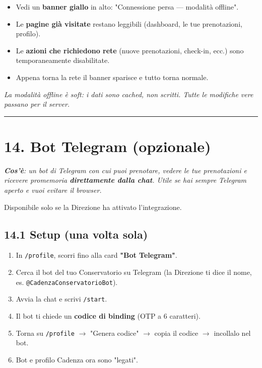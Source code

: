 \documentclass[11pt,a4paper]{article}
\renewenvironment{quote}
  {\begin{list}{}{%
      \setlength{\leftmargin}{8pt}%
      \setlength{\rightmargin}{8pt}%
      \setlength{\topsep}{6pt}%
      \setlength{\parsep}{0pt}}%
      \item\relax\color{black!75}\itshape}
  {\end{list}}
\begin{document}
\begin{itemize}
  \item Vedi un \textbf{banner giallo} in alto: "Connessione persa --- modalità offline".
  \item Le \textbf{pagine già visitate} restano leggibili (dashboard, le tue prenotazioni, profilo).
  \item Le \textbf{azioni che richiedono rete} (nuove prenotazioni, check-in, ecc.) sono temporaneamente disabilitate.
  \item Appena torna la rete il banner sparisce e tutto torna normale.
\end{itemize}

\begin{quote}
La modalità offline è soft: i dati sono cached, non scritti. Tutte le modifiche vere passano per il server.
\end{quote}

\medskip\hrule\medskip

\section{14. Bot Telegram (opzionale)}


\begin{quote}
\textbf{Cos'è}: un bot di Telegram con cui puoi prenotare, vedere le tue prenotazioni e ricevere promemoria \textbf{direttamente dalla chat}. Utile se hai sempre Telegram aperto e vuoi evitare il browser.
\end{quote}

Disponibile solo se la Direzione ha attivato l'integrazione.

\subsection{14.1 Setup (una volta sola)}


\begin{enumerate}
  \item In \texttt{/profile}, scorri fino alla card \textbf{"Bot Telegram"}.
  \item Cerca il bot del tuo Conservatorio su Telegram (la Direzione ti dice il nome, es. \texttt{@CadenzaConservatorioBot}).
  \item Avvia la chat e scrivi \texttt{/start}.
  \item Il bot ti chiede un \textbf{codice di binding} (OTP a 6 caratteri).
  \item Torna su \texttt{/profile} $\rightarrow$ "Genera codice" $\rightarrow$ copia il codice $\rightarrow$ incollalo nel bot.
  \item Bot e profilo Cadenza ora sono "legati".
\end{enumerate}
\end{document}

